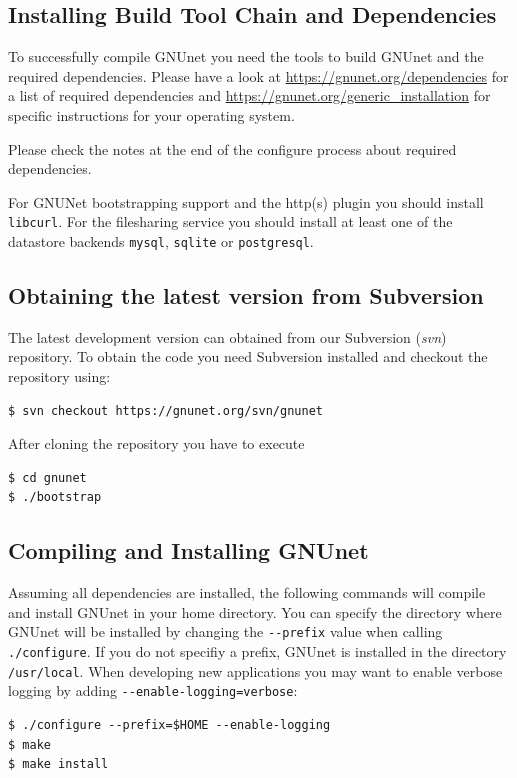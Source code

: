 \documentclass[10pt]{article}
\begin{document}
\subsection{Installing Build Tool Chain and Dependencies}
To successfully compile GNUnet you need the tools to build GNUnet and the required dependencies.
Please have a look at \url{https://gnunet.org/dependencies} for a list of required dependencies 
and \url{https://gnunet.org/generic_installation} for specific instructions for your operating system.

Please check the notes at the end of the configure process about required dependencies.

For GNUNet bootstrapping support and the http(s) plugin you should install \texttt{libcurl}.
For the filesharing service you should install at least one of the datastore backends \texttt{mysql}, 
\texttt{sqlite} or \texttt{postgresql}.

\subsection{Obtaining the latest version from Subversion}
The latest development version can obtained from our Subversion (\textit{svn}) repository. To obtain 
the code you need Subversion installed and checkout the repository using:
\lstset{language=bash}
\begin{lstlisting}
$ svn checkout https://gnunet.org/svn/gnunet
\end{lstlisting}
After cloning the repository you have to execute
\lstset{language=bash}
\begin{lstlisting}
$ cd gnunet
$ ./bootstrap
\end{lstlisting}


\subsection{Compiling and Installing GNUnet}
\label{sub:install}
Assuming all dependencies are installed, the following commands will compile and install GNUnet in your 
home directory. You can specify the directory where GNUnet will be installed by changing the \lstinline|--prefix| value when calling \lstinline|./configure|.  If you do not specifiy a prefix, GNUnet is installed in the directory \lstinline|/usr/local|. When developing new applications you may want to enable 
verbose logging by adding \lstinline|--enable-logging=verbose|:

\lstset{language=bash}
\begin{lstlisting}
$ ./configure --prefix=$HOME --enable-logging
$ make
$ make install 
\end{lstlisting}
\end{document}
